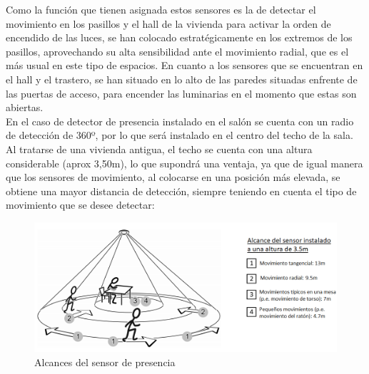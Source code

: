 Como la función que tienen asignada estos sensores es la de detectar el movimiento en los pasillos y el hall de la vivienda para activar la orden de encendido de las luces, se han colocado estratégicamente en los extremos de los pasillos, aprovechando su alta sensibilidad ante el movimiento radial, que es el más usual en este tipo de espacios. En cuanto a los sensores que se encuentran en el hall y el trastero, se han situado en lo alto de las paredes situadas enfrente de las puertas de acceso, para encender las luminarias en el momento que estas son abiertas.\\
En el caso de detector de presencia instalado en el salón se cuenta con un radio de detección de 360º, por lo que será instalado en el centro del techo de la sala. Al tratarse de una vivienda antigua, el techo se cuenta con una altura considerable (aprox 3,50m), lo que supondrá una ventaja, ya que de igual manera que los sensores de movimiento, al colocarse en una posición más elevada, se obtiene una mayor distancia de detección, siempre teniendo en cuenta el tipo de movimiento que se desee detectar:
\begin{figure}[H]
\includegraphics[width=1.15\textwidth]{figures/alcance_presencia.png}   
\caption{Alcances del sensor de presencia}
\label{fig:alcance_presencia}
\end{figure}


